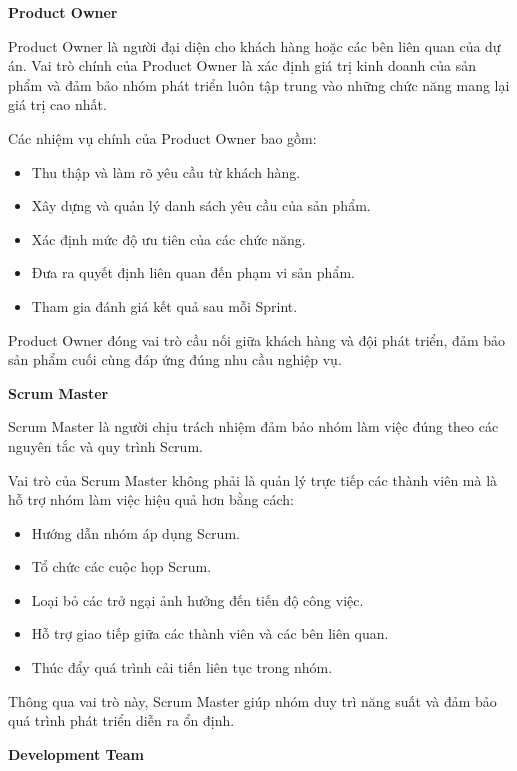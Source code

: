 \textbf{Product Owner}

\hspace{0.2cm}Product Owner là người đại diện cho khách hàng hoặc các bên liên quan của dự án. Vai trò chính của Product Owner là xác định giá trị kinh doanh của sản phẩm và đảm bảo nhóm phát triển luôn tập trung vào những chức năng mang lại giá trị cao nhất.

\hspace{0.2cm}Các nhiệm vụ chính của Product Owner bao gồm:

\begin{itemize}
\item Thu thập và làm rõ yêu cầu từ khách hàng.
\item Xây dựng và quản lý danh sách yêu cầu của sản phẩm.
\item Xác định mức độ ưu tiên của các chức năng.
\item Đưa ra quyết định liên quan đến phạm vi sản phẩm.
\item Tham gia đánh giá kết quả sau mỗi Sprint.
\end{itemize}

Product Owner đóng vai trò cầu nối giữa khách hàng và đội phát triển, đảm bảo sản phẩm cuối cùng đáp ứng đúng nhu cầu nghiệp vụ.

\textbf{Scrum Master}

\hspace{0.2cm}Scrum Master là người chịu trách nhiệm đảm bảo nhóm làm việc đúng theo các nguyên tắc và quy trình Scrum.

\hspace{0.2cm}Vai trò của Scrum Master không phải là quản lý trực tiếp các thành viên mà là hỗ trợ nhóm làm việc hiệu quả hơn bằng cách:

\begin{itemize}
\item Hướng dẫn nhóm áp dụng Scrum.
\item Tổ chức các cuộc họp Scrum.
\item Loại bỏ các trở ngại ảnh hưởng đến tiến độ công việc.
\item Hỗ trợ giao tiếp giữa các thành viên và các bên liên quan.
\item Thúc đẩy quá trình cải tiến liên tục trong nhóm.
\end{itemize}

Thông qua vai trò này, Scrum Master giúp nhóm duy trì năng suất và đảm bảo quá trình phát triển diễn ra ổn định.

\textbf{Development Team}

